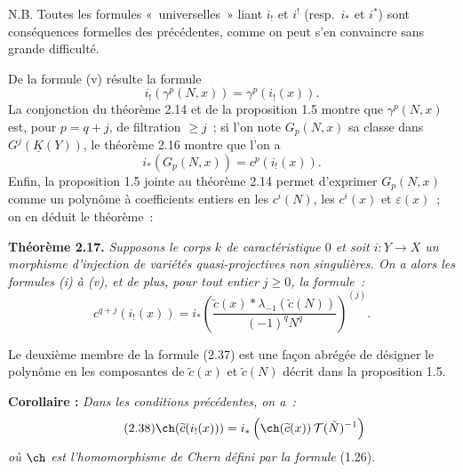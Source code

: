 N.B.
Toutes les formules «~universelles~» liant $i_!$ et $i^!$ (resp.\ $i_*$ et $i^*$) sont conséquences formelles des précédentes, comme on peut s'en convaincre sans grande difficulté.

De la formule (v) résulte la formule
\[
 i_!(\gamma^p(N,x))=\gamma^p(i_!(x)).
\]
La conjonction du théorème 2.14 et de la proposition 1.5 montre que $\gamma^p(N,x)$ est, pour $p=q+j$, de filtration $\geq j$~; si l'on note $G_p(N,x)$ sa classe dans $G^j(\underline K(Y))$, le théorème 2.16 montre que l'on a
\[
 i_*(G_p(N,x))=c^p(i_!(x)).
\]
Enfin, la proposition 1.5 jointe au théorème 2.14 permet d'exprimer $G_p(N,x)$ comme un polynôme à coefficients entiers en les $c^i(N)$, les $c^i(x)$ et $\varepsilon(x)$~; on en déduit le théorème~:

\textbf{Théorème 2.17.} \emph{Supposons le corps $k$ de caractéristique $0$ et soit $i:Y\longrightarrow X$ un morphisme d'injection de variétés quasi-projectives non singulières. On a alors les formules (i) à (v), et de plus, pour tout entier $j\geq0$, la formule~:}
\begin{equation}\tag{2.37}
 c^{q+j}(i_!(x))=i_*\left(\frac{\widetilde c(x)*\lambda_{-1}(\widetilde c(N))}{(-1)^qN^q}\right)^{(j)}.
\end{equation}

Le deuxième membre de la formule (2.37) est une façon abrégée de désigner le polynôme en les composantes de $\widetilde c(x)$ et $\widetilde c(N)$ décrit dans la proposition 1.5.

\textbf{Corollaire :} \emph{Dans les conditions précédentes, on a~:}
\begin{equation}\tag{2.38}
 \ch(\widetilde c(i_!(x)))=i_*\left(\ch(\widetilde c(x))\,\mathcal T(\check N)^{-1}\right)
\end{equation}
\emph{où $\ch$ est l'homomorphisme de Chern défini par la formule} (1.26).

